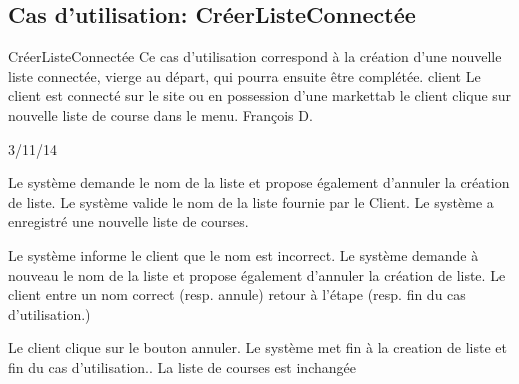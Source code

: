\subsection{Cas d'utilisation: CréerListeConnectée}

\startCU
\nom CréerListeConnectée
\but Ce cas d’utilisation correspond à la création d’une nouvelle liste connectée, vierge au départ, qui pourra ensuite être complétée.
\acteur client
\precondition Le client est connecté sur le site ou en possession d'une markettab
\declenchement le client clique sur nouvelle liste de course dans le menu.
\auteur François D.
\date 03/11/14

\nominal %
\startnominal
{} Le système demande le nom de la liste et propose également d'annuler la création de liste.
 Le système valide le nom de la liste fournie par le Client.
\stopnominal
\postcondition Le système a enregistré une nouvelle liste de courses.

\alternatifs %
  \etape Le système informe le client que le nom est incorrect.
  \etape Le système demande à nouveau le nom de la liste et propose également d'annuler la création de liste.
  \etape Le client entre un nom correct (resp. annule)
  \etape retour à l'étape (resp. fin du cas d'utilisation.)
\stopcondition
\stopalternatif

\exception %
  \etape Le client clique sur le bouton annuler.
  \etape Le système met fin à la creation de liste et fin du cas d'utilisation..
\stopcondition
\postcondition La liste de courses est inchangée
\stopalternatif
\stopCU
